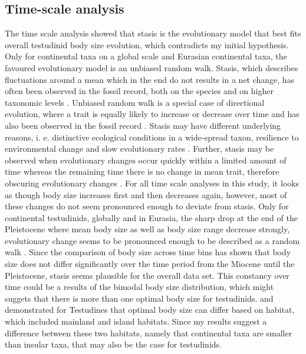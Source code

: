 
\subsection{Time-scale analysis}

The time scale analysis showed that stasis is the evolutionary model that best fits overall testudinid body size evolution, which contradicts my initial hypothesis.
Only for continental taxa on a global scale and Eurasian continental taxa, the favoured evolutionary model is an unbiased random walk.
Stasis, which describes fluctuations around a mean which in the end do not results in a net change, has often been observed in the fossil record, both on the species and on higher taxonomic levels \citep{Smith2016,Hunt2006,Pimiento2015, Hunt2015}. 
Unbiased random walk is a special case of directional evolution, where a trait is equally likely to increase or decrease over time \citep{Hunt2004} and has also been observed in the fossil record \citep{Hunt2006,Smith2016,Hunt2004}.
Stasis may have different underlying reasons, i. e. distinctive ecological conditions in a wide-spread taxon, resilience to environmental change and slow evolutionary rates \citep{Pimiento2015,Hunt2015,Sheldon1996,Benton2001}.
Further, stasis may be observed when evolutionary changes occur quickly within a limited amount of time whereas the remaining time there is no change in mean trait, therefore obscuring evolutionary changes \citep{Hunt2004}.
For all time scale analyses in this study, it looks as though body size increases first and then decreases again, however, most of these changes do not seem pronounced enough to deviate from stasis. Only for continental testudinids, globally and in Eurasia, the sharp drop at the end of the Pleistocene where mean body size as well as body size range decrease strongly, evolutionary change seems to be pronounced enough to be described as a random walk \citep{Hunt2004, Hunt2015}.
Since the comparison of body size across time bins has shown that body size does not differ significantly over the time period from the Miocene until the Pleistocene, stasis seems plausible for the overall data set.
This constancy over time could be a results of the bimodal body size distribution, which might suggets that there is more than one optimal body size for testudinids. \cite{Angielczyk2015} and \cite{Jaffe2011a} demonstrated for Testudines that optimal body size can differ based on habitat, which included mainland and island habitats. Since my results suggest a difference between these two habitats, namely that continental taxa are smaller than insular taxa, that may also be the case for testudinids. 
